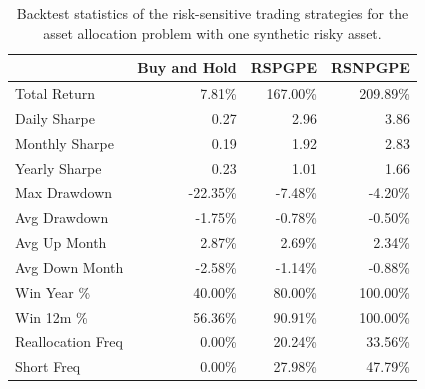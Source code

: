 \begin{table}[h!]
\centering
\begin{tabular}{@{}lrrr@{}}
\toprule
                  & \multicolumn{1}{c}{Buy and Hold} & \multicolumn{1}{c}{RSPGPE} & \multicolumn{1}{c}{RSNPGPE} \\ \midrule
Total Return      & 7.81\%                           & 167.00\%                   & 209.89\%                    \\
Daily Sharpe      & 0.27                             & 2.96                       & 3.86                        \\
Monthly Sharpe    & 0.19                             & 1.92                       & 2.83                        \\
Yearly Sharpe     & 0.23                             & 1.01                       & 1.66                        \\
Max Drawdown      & -22.35\%                         & -7.48\%                    & -4.20\%                     \\
Avg Drawdown      & -1.75\%                          & -0.78\%                    & -0.50\%                     \\
Avg Up Month      & 2.87\%                           & 2.69\%                     & 2.34\%                      \\
Avg Down Month    & -2.58\%                          & -1.14\%                    & -0.88\%                     \\
Win Year \%       & 40.00\%                          & 80.00\%                    & 100.00\%                    \\
Win 12m \%        & 56.36\%                          & 90.91\%                    & 100.00\%                    \\
Reallocation Freq & 0.00\%                           & 20.24\%                    & 33.56\%                     \\
Short Freq        & 0.00\%                           & 27.98\%                    & 47.79\%                     \\ \bottomrule
\end{tabular}
\caption[Backtest statistics for risk-sensitive learning with one synthetic risky asset.]{Backtest statistics of the risk-sensitive trading strategies for the asset allocation problem with one synthetic risky asset.}
\label{tab:single_synthetic_sensitive_performance}
\end{table}
\clearpage
